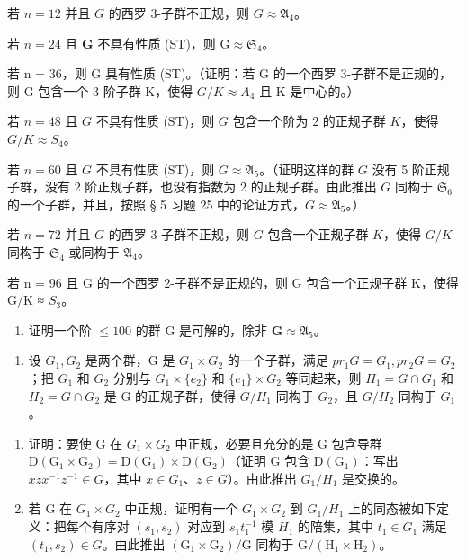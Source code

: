 若 \(n = 12\) 并且 \(G\) 的西罗 3-子群不正规，则 \(G \approx \mathfrak{A}_4\)。

若 \(n = 24\) 且 \(\mathbf{G}\) 不具有性质 (ST)，则 \(\mathrm{G} \approx \mathfrak{S}_4\)。

若 n = 36，则 G 具有性质 (ST)。（证明：若 G 的一个西罗 3-子群不是正规的，则 G 包含一个 3 阶子群 K，使得 \(G/K \approx A_{4}\) 且 K 是中心的。）

若 \(n = 48\) 且 \(G\) 不具有性质 (ST)，则 \(G\) 包含一个阶为 2 的正规子群 \(K\)，使得 \(G / K \approx S_4\)。

若 \(n = 60\) 且 \(G\) 不具有性质 (ST)，则 \(G \approx \mathfrak{A}_5\)。（证明这样的群 \(G\) 没有 5 阶正规子群，没有 2 阶正规子群，也没有指数为 2 的正规子群。由此推出 \(G\) 同构于 \(\mathfrak{S}_6\) 的一个子群，并且，按照 § 5 习题 25 中的论证方式，\(G \approx \mathfrak{A}_5\)。）

若 \(n = 72\) 并且 \(G\) 的西罗 3-子群不正规，则 \(G\) 包含一个正规子群 \(K\)，使得 \(G / K\) 同构于 \(\mathfrak{S}_4\) 或同构于 \(\mathfrak{A}_4\)。

若 n = 96 且 G 的一个西罗 2-子群不是正规的，则 G 包含一个正规子群 K，使得 G/K ≈ \(S_{3}\)。

\begin{enumerate}
\def\labelenumi{(\alph{enumi})}
\setcounter{enumi}{3}
\tightlist
\item
  证明一个阶 \(\leqslant 100\) 的群 G 是可解的，除非 \(\mathbf{G} \approx \mathfrak{A}_5\)。
\end{enumerate}

\begin{enumerate}
\def\labelenumi{\arabic{enumi}。}
\setcounter{enumi}{39}
\tightlist
\item
  设 \(G_{1}, G_{2}\) 是两个群，G 是 \(G_{1} \times G_{2}\) 的一个子群，满足 \(pr_{1} G = G_{1}, pr_{2} G = G_{2}\)；把 \(G_{1}\) 和 \(G_{2}\) 分别与 \(G_{1} \times \{e_{2}\}\) 和 \(\{e_{1}\} \times G_{2}\) 等同起来，则 \(H_{1} = G \cap G_{1}\) 和 \(H_{2} = G \cap G_{2}\) 是 G 的正规子群，使得 \(G/H_{1}\) 同构于 \(G_{2}\)，且 \(G/H_{2}\) 同构于 \(G_{1}\)。
\end{enumerate}

\begin{enumerate}
\def\labelenumi{(\alph{enumi})}
\item
  证明：要使 G 在 \(G_{1} \times G_{2}\) 中正规，必要且充分的是 G 包含导群 \(\mathrm{D}(\mathrm{G}_{1} \times \mathrm{G}_{2}) = \mathrm{D}(\mathrm{G}_{1}) \times \mathrm{D}(\mathrm{G}_{2})\)（证明 G 包含 \(\mathrm{D}(\mathrm{G}_{1})\)：写出 \(xzx^{-1}z^{-1} \in G\)，其中 \(x \in G_{1}\)、\(z \in G\)）。由此推出 \(G_{1}/H_{1}\) 是交换的。
\item
  若 G 在 \(G_{1} \times G_{2}\) 中正规，证明有一个 \(G_{1} \times G_{2}\) 到 \(G_{1}/H_{1}\) 上的同态被如下定义：把每个有序对 \((s_{1}, s_{2})\) 对应到 \(s_{1}t_{1}^{-1}\) 模 \(H_{1}\) 的陪集，其中 \(t_{1} \in G_{1}\) 满足 \((t_{1}, s_{2}) \in G\)。由此推出 \((\mathrm{G}_{1} \times \mathrm{G}_{2})/\mathrm{G}\) 同构于 \(\mathrm{G}/(\mathrm{H}_{1} \times \mathrm{H}_{2})\)。
\end{enumerate}

